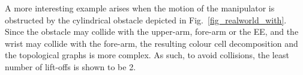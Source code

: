 \documentclass[journal]{IEEEtran}
\begin{document}
A more interesting example arises when the motion of the manipulator is obstructed by the cylindrical obstacle 
depicted in Fig.~\ref{fig_realworld_with}. Since the obstacle may collide with the upper-arm, fore-arm or the EE, 
and the wrist may collide with the fore-arm, %
the resulting colour cell decomposition and the topological graphs is more complex. As such, to avoid collisions, 
the least number of lift-offs is shown to be 2. 

\end{document}

